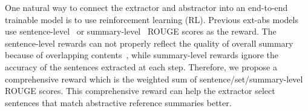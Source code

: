 %
One natural way to connect the extractor and abstractor into an 
end-to-end trainable model is to use reinforcement learning (RL). 
Previous ext-abs models use sentence-level~\cite{FastAbs18}
or summary-level~\cite{summlevel19} ROUGE scores as the reward.
The sentence-level rewards can not properly reflect the quality of 
overall summary because of overlapping contents~\cite{NarayanCL18,summlevel19},
while summary-level rewards ignore the accuracy of the sentences extracted 
at each step.
Therefore, we propose a comprehensive reward 
which is the weighted sum of sentence/set/summary-level ROUGE scores.
This comprehensive reward can help the extractor select sentences 
that match abstractive reference summaries better.


